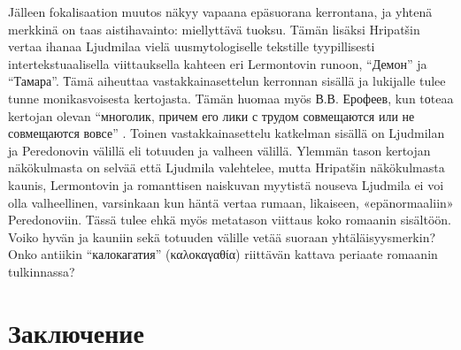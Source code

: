 \documentclass[12pt,a4paper]{article}
\begin{document}
Jälleen fokalisaation muutos näkyy vapaana epäsuorana kerrontana, ja yhtenä merkkinä on taas aistihavainto: miellyttävä tuoksu. %
Tämän lisäksi Hripatšin vertaa ihanaa Ljudmilaa vielä uusmytologiselle tekstille tyypillisesti intertekstuaalisella viittauksella kahteen eri Lermontovin runoon, \enquote{Демон} ja \enquote{Тамара}. Тämä aiheuttaa vastakkainasettelun kerronnan sisällä ja lukijalle tulee tunne monikasvoisesta kertojasta. Tämän huomaa myös В.В. Ерофеев, kun tоteaa kertojan olevan \enquote{многолик, причем его лики с трудом совмещаются или не совмещаются вовсе} \parencite[157]{jerofeev1985}. Toinen vastakkainasettelu katkelman sisällä on Ljudmilan ja Peredonovin välillä eli totuuden ja valheen välillä. Ylemmän tason kertojan näkökulmasta on selvää että Ljudmila valehtelee, mutta Hripatšin näkökulmasta kaunis, Lermontovin ja romanttisen naiskuvan myytistä nouseva Ljudmila ei voi olla valheellinen, varsinkaan kun häntä vertaa rumaan, likaiseen, «epänormaaliin» Peredonoviin. Tässä tulee ehkä myös metatason viittaus koko romaanin sisältöön. Voiko hyvän ja kauniin sekä totuuden välille vetää suoraan yhtäläisyysmerkin? Onko antiikin \enquote{калокагатия} (\foreignlanguage{greek}{καλοκαγαθία}) riittävän kattava periaate romaanin tulkinnassa?


\section{Заключение}

\nocite{*}


\printbibheading[heading=bibliography,title={Список использованной литературы}]
\printbibliography[heading=subbibliography,keyword={primary},title={Источники}]
\printbibliography[heading=subbibliography,notkeyword={primary},title={Исследовательская литература}]
\end{document}
